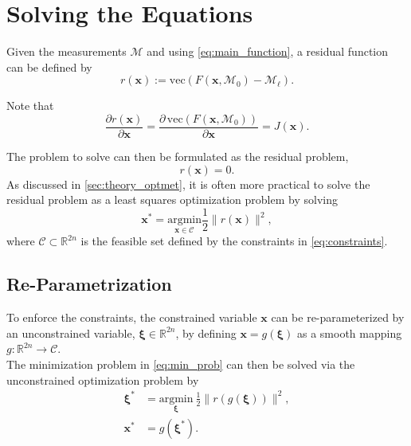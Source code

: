 \FloatBarrier
\newpage

\section{Solving the Equations}
\label{sec:solving_eq}

Given the measurements $\mathcal{M}$ and using \cref{eq:main_function}, a residual function can be defined by
\begin{equation}
    \label{eq:residual}
    r(\mathbf{x}) := \mathrm{vec}(F(\mathbf{x},\mathcal{M}_0) - \mathcal{M}_{\ell}).
\end{equation}

Note that
\begin{equation*}
    \frac{\partial r(\mathbf{x})}{\partial \mathbf{x}} = 
    \frac{\partial\,\mathrm{vec}(F(\mathbf{x},\mathcal{M}_0))}{\partial \mathbf{x}} =
    J(\mathbf{x}).
\end{equation*}

The problem to solve can then be formulated as the residual problem,
\begin{equation*}
    r(\mathbf{x})=0.
\end{equation*}
As discussed in \autoref{sec:theory_optmet}, it is often more practical to solve the residual problem as a least squares optimization problem by solving
\begin{equation}
\label{eq:min_prob}
    \mathbf{x}^* = \underset{\mathbf{x}\in \mathcal{C}}{\text{argmin}} \frac{1}{2}\|r(\mathbf{x})\|^2,
\end{equation}
where $\mathcal{C} \subset \mathbb{R}^{2n}$ is the feasible set defined by the constraints in \cref{eq:constraints}.

\subsection{Re-Parametrization}
To enforce the constraints, the constrained variable $\mathbf{x}$ can be re-parameterized by an unconstrained variable, $\bm{\xi} \in \mathbb{R}^{2n}$, by defining $\mathbf{x}=g(\bm{\xi})$ as a smooth mapping $g : \mathbb{R}^{2n} \to \mathcal{C}$.\\

The minimization problem in \cref{eq:min_prob} can then be solved via the unconstrained optimization problem by
\begin{equation}
\label{eq:min_prob_via_y}
\begin{aligned}
    \bm{\xi}^* &= \underset{\bm{\xi}}{\text{argmin}}\ \frac{1}{2}\| r(g(\bm{\xi}))\|^2, \\
    \mathbf{x}^* &= g(\bm{\xi}^*).
\end{aligned}
\end{equation}


